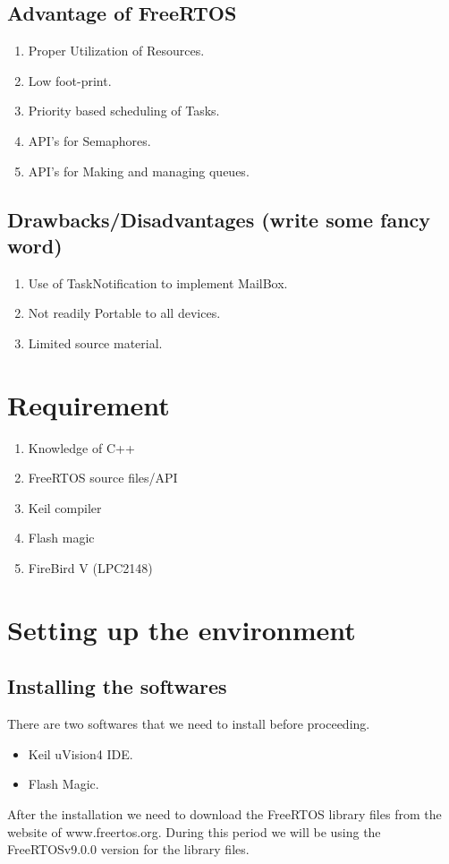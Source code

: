 \documentclass[11pt,a4paper]{book}
\begin{document}
	\subsection{Advantage of FreeRTOS}
	\begin{enumerate}
		\item Proper Utilization of Resources.
		\item Low foot-print.
		\item Priority based scheduling of Tasks.
		\item API's for Semaphores.
		\item API's for Making and managing queues.
	\end{enumerate} 

	\subsection{Drawbacks/Disadvantages (write some fancy word)}
	\begin{enumerate}
		\item Use of TaskNotification to implement MailBox.
		\item Not readily Portable to all devices.
		\item Limited source material.
	\end{enumerate} 
\newpage
\section{Requirement}
\begin{enumerate}
	\item Knowledge of C++ 
	\item FreeRTOS source files/API
	\item Keil compiler
	\item Flash magic
	\item FireBird V (LPC2148)
\end{enumerate}

\section{Setting up the environment}

\subsection{Installing the softwares}
There are two softwares that we need to install before proceeding.
\begin{itemize}
	\item Keil uVision4 IDE.
	\item Flash Magic.
\end{itemize}
After the installation we need to download the FreeRTOS library files from the website of www.freertos.org. During this period we will be using the FreeRTOSv9.0.0 version for the library files.
\end{document}
